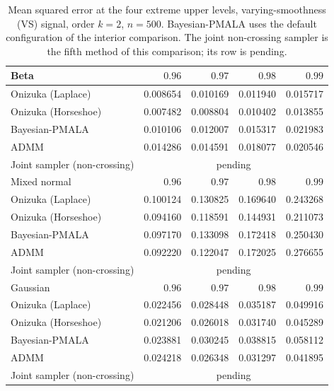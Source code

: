 \begin{table}[!htbp]
\centering
\small
\caption{Mean squared error at the four extreme upper levels, varying-smoothness (VS) signal, order $k=2$, $n=500$. Bayesian-PMALA uses the default configuration of the interior comparison. The joint non-crossing sampler is the fifth method of this comparison; its row is pending.}
\label{tab:vs_ext_upper_mse}
\begin{tabular}{lrrrr}
\toprule
Beta & $0.96$ & $0.97$ & $0.98$ & $0.99$ \\
\midrule
Onizuka (Laplace) & 0.008654 & 0.010169 & 0.011940 & 0.015717 \\
Onizuka (Horseshoe) & 0.007482 & 0.008804 & 0.010402 & 0.013855 \\
Bayesian-PMALA & 0.010106 & 0.012007 & 0.015317 & 0.021983 \\
ADMM & 0.014286 & 0.014591 & 0.018077 & 0.020546 \\
Joint sampler (non-crossing) & \multicolumn{4}{c}{pending} \\
\midrule
Mixed normal & $0.96$ & $0.97$ & $0.98$ & $0.99$ \\
\midrule
Onizuka (Laplace) & 0.100124 & 0.130825 & 0.169640 & 0.243268 \\
Onizuka (Horseshoe) & 0.094160 & 0.118591 & 0.144931 & 0.211073 \\
Bayesian-PMALA & 0.097170 & 0.133098 & 0.172418 & 0.250430 \\
ADMM & 0.092220 & 0.122047 & 0.172025 & 0.276655 \\
Joint sampler (non-crossing) & \multicolumn{4}{c}{pending} \\
\midrule
Gaussian & $0.96$ & $0.97$ & $0.98$ & $0.99$ \\
\midrule
Onizuka (Laplace) & 0.022456 & 0.028448 & 0.035187 & 0.049916 \\
Onizuka (Horseshoe) & 0.021206 & 0.026018 & 0.031740 & 0.045289 \\
Bayesian-PMALA & 0.023881 & 0.030245 & 0.038815 & 0.058112 \\
ADMM & 0.024218 & 0.026348 & 0.031297 & 0.041895 \\
Joint sampler (non-crossing) & \multicolumn{4}{c}{pending} \\
\bottomrule
\end{tabular}
\end{table}
